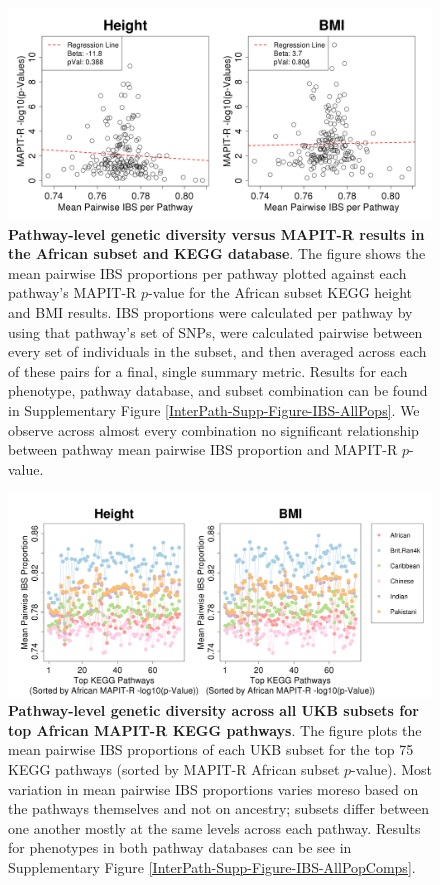 \documentclass[12pt,a4paper]{article}
\begin{document}
\begin{figure}[htb]
\centering
\includegraphics[scale=.35]{Images/Main/InterPath_Main_Figure_IBS_vs3_African.png}
\caption[TBD]{\textbf{Pathway-level genetic diversity versus MAPIT-R results in the African subset and KEGG database}. The figure shows the mean pairwise IBS proportions per pathway plotted against each pathway's MAPIT-R $p$-value for the African subset KEGG height and BMI results. IBS proportions were calculated per pathway by using that pathway's set of SNPs, were calculated pairwise between every set of individuals in the subset, and then averaged across each of these pairs for a final, single summary metric. Results for each phenotype, pathway database, and subset combination can be found in Supplementary Figure \ref{InterPath-Supp-Figure-IBS-AllPops}. We observe across almost every combination no significant relationship between pathway mean pairwise IBS proportion and MAPIT-R $p$-value.}
\label{InterPath-Main-Figure-IBS-African}
\end{figure}

\begin{figure}[htb]
\centering
\includegraphics[scale=.35]{Images/Main/InterPath_Main_Figure_IBS_AllPopComps_vs3_KEGG.png}
\caption[TBD]{\textbf{Pathway-level genetic diversity across all UKB subsets for top African MAPIT-R KEGG pathways}. The figure plots the mean pairwise IBS proportions of each UKB subset for the top 75 KEGG pathways (sorted by MAPIT-R African subset $p$-value). Most variation in mean pairwise IBS proportions varies moreso based on the pathways themselves and not on ancestry; subsets differ between one another mostly at the same levels across each pathway. Results for phenotypes in both pathway databases can be see in Supplementary Figure \ref{InterPath-Supp-Figure-IBS-AllPopComps}.}
\label{InterPath-Main-Figure-IBS-AllPopComps-KEGG}
\end{figure}
\end{document}
